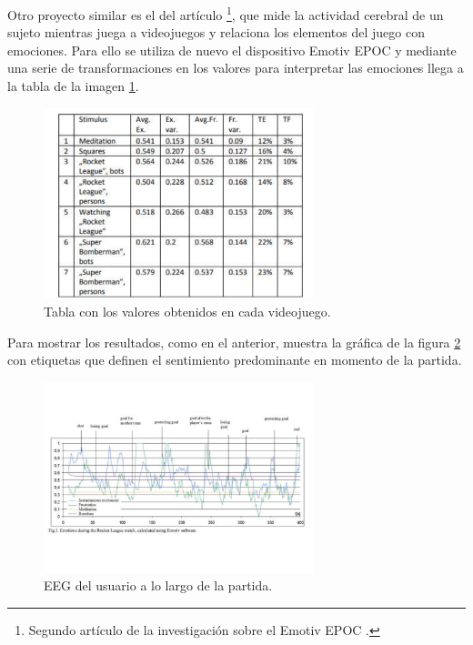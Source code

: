 Otro proyecto similar es el del artículo \cite{ArticuloDiscusion2}\footnote{Segundo artículo de la investigación sobre el Emotiv EPOC \cite{ArticuloDiscusion1}.}, que mide la actividad cerebral de un sujeto mientras juega a videojuegos y relaciona los elementos del juego con emociones. Para ello se utiliza de nuevo el dispositivo Emotiv EPOC y mediante una serie de transformaciones en los valores para interpretar las emociones llega a la tabla de la imagen \ref{fig: TablaDiscusion2}.

\begin{figure}[h]
    \centering
    \includegraphics[width=0.7\textwidth]{img/TablaDiscusion2.pdf}
    \caption{Tabla con los valores obtenidos en cada videojuego.}
    \label{fig: TablaDiscusion2}
    \end{figure}

Para mostrar los resultados, como en el anterior, muestra la gráfica de la figura \ref{fig: EEGDiscusion2} con etiquetas que definen el sentimiento predominante en momento de la partida.

\begin{figure}[h]
    \centering
    \includegraphics[width=0.7\textwidth]{img/EEGDiscusion2.pdf}
    \caption{EEG del usuario a lo largo de la partida.}
    \label{fig: EEGDiscusion2}
    \end{figure}
